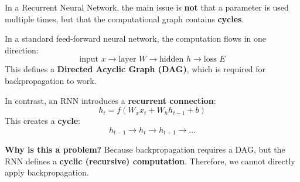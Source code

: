 \newpage

\begin{deepeningbox}
    In a Recurrent Neural Network, the main issue is \textbf{not} that a parameter is used multiple times, but that the computational graph contains \textbf{cycles}.

    \highspace
    In a standard feed-forward neural network, the computation flows in one direction:
    \begin{equation*}
        \text{input } x \rightarrow \text{layer } W \rightarrow \text{hidden } h \rightarrow \text{loss } E
    \end{equation*}
    This defines a \textbf{Directed Acyclic Graph (DAG)}, which is required for backpropagation to work.

    \highspace
    In contrast, an RNN introduces a \textbf{recurrent connection}:
    \begin{equation*}
        h_t = f(W_x x_t + W_h h_{t-1} + b)
    \end{equation*}
    This creates a \textbf{cycle}:
    \begin{equation*}
        h_{t-1} \rightarrow h_t \rightarrow h_{t+1} \rightarrow \ldots
    \end{equation*}

    \textcolor{Red2}{ \textbf{Why is this a problem?}}
    Because backpropagation requires a DAG, but the RNN defines a \textbf{cyclic (recursive) computation}. Therefore, we cannot directly apply backpropagation.


\end{deepeningbox}
